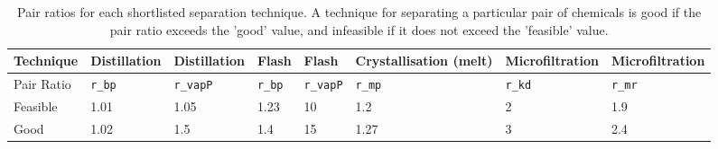 \begin{landscape}
\begin{table}[H]
\centering
\caption{Pair ratios for each shortlisted separation technique. A technique for separating a particular pair of chemicals is good if the pair ratio exceeds the 'good' value, and infeasible if it does not exceed the 'feasible' value.}
\label{tab:separation-pair-ratio}
\begin{tabular}{llllllll}
\toprule
Technique  & Distillation & Distillation & Flash & Flash   & Crystallisation (melt) & Microfiltration & Microfiltration \\ \midrule
Pair Ratio & \texttt{r\_bp}        & \texttt{r\_vapP}      & \texttt{r\_bp} & \texttt{r\_vapP} & \texttt{r\_mp}                  & \texttt{r\_kd}           & \texttt{r\_mr}           \\
Feasible   & 1.01         & 1.05         & 1.23  & 10      & 1.2                    & 2               & 1.9             \\
Good       & 1.02         & 1.5          & 1.4   & 15      & 1.27                   & 3               & 2.4             \\ \bottomrule
\end{tabular}
\end{table}

\end{landscape}








